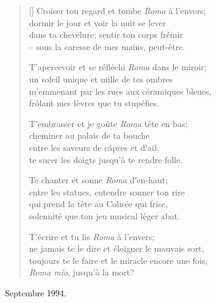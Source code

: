 \documentclass[a4paper,11pt]{article}
\begin{document}


\bigskip

\begin{verse}[\versewidth]
  Croiser ton regard et tombe \emph{Roma} à l'envers; \\
  dormir le jour et voir la nuit se lever \\
  dans ta chevelure; sentir ton corps frémir \\
  -- sous la caresse de mes mains, peut-être.

  T'apercevoir et se réfléchi \emph{Roma} dans le miroir; \\
  un soleil unique et mille de tes ombres \\
  m'emmenant par les rues aux céramiques bleues, \\
  frôlant mes lèvres que tu stupéfies.

  T'embrasser et je goûte \emph{Roma} tête en bas; \\
  cheminer au palais de ta bouche \\
  entre les saveurs de câpres et d'ail; \\
  te sucer les doigts jusqu'à te rendre folle.

  Te chanter et sonne \emph{Roma} d'en-haut; \\
  entre les statues, entendre sonner ton rire \\
  qui prend la tête au Colisée qui frise, \\
  solennité que ton jeu musical léger abat.

  T'écrire et tu lis \emph{Roma} à l'envers; \\
  ne jamais te le dire et éloigner le mauvais sort, \\
  toujours te le faire et le miracle encore une fois, \\
  \emph{Roma mío}, jusqu'à la mort?
\end{verse}

\bigskip \bigskip \qquad Septembre 1994.
\end{document}
